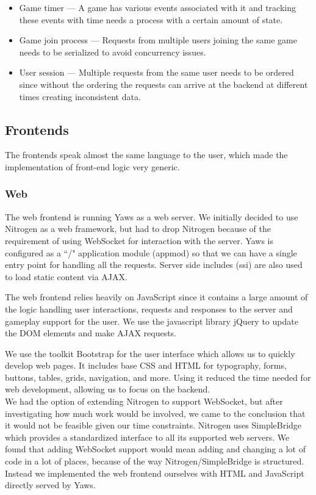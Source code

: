 \documentclass[11pt,a4paper]{report}
\begin{document}
\begin{itemize}
\item Game timer --- A game has various events associated with it and
tracking these events with time needs a process with a certain amount
of state.
\item Game join process --- Requests from multiple users joining the same
game needs to be serialized to avoid concurrency issues.
\item User session --- Multiple requests from the same user needs to be
ordered since without the ordering the requests can arrive at the backend
at different times creating inconsistent data.
\end{itemize}

\subsection{Frontends}
\label{sec:frontends}
The frontends speak almost the same language to the user, which made the
implementation of front-end logic very generic.

\subsubsection{Web}
The web frontend is running Yaws as a web server.
We initially decided to use Nitrogen as a web framework, but had to drop Nitrogen
because of the requirement of using WebSocket for interaction with the server.
Yaws is configured as a ``/" application module (appmod) so that we can have a
single entry point for handling all the requests. Server side includes (ssi) are
also used to load static content via AJAX.

The web frontend relies heavily on JavaScript since it contains a large amount
of the logic handling user interactions, requests and responses to the server
and gameplay support for the user. We use the javascript library jQuery
\cite{jquery} to update the DOM elements and make AJAX requests.

We use the toolkit Bootstrap\cite{bootstrap} for the user interface which
allows us to quickly develop web pages. It includes base CSS and HTML for
typography, forms, buttons, tables, grids, navigation, and more. Using it
reduced the time needed for web development, allowing us to focus on the
backend.\\

We had the option of extending Nitrogen to support WebSocket, but after
investigating how much work would be involved, we came to the conclusion that it
would not be feasible given our time constraints. Nitrogen uses SimpleBridge
which provides a standardized interface to all its supported web servers. We
found that adding WebSocket support would mean adding and changing a lot of
code in a lot of places, because of the way Nitrogen/SimpleBridge is structured.
Instead we implemented the web frontend ourselves with HTML and JavaScript
directly served by Yaws.
\end{document}

